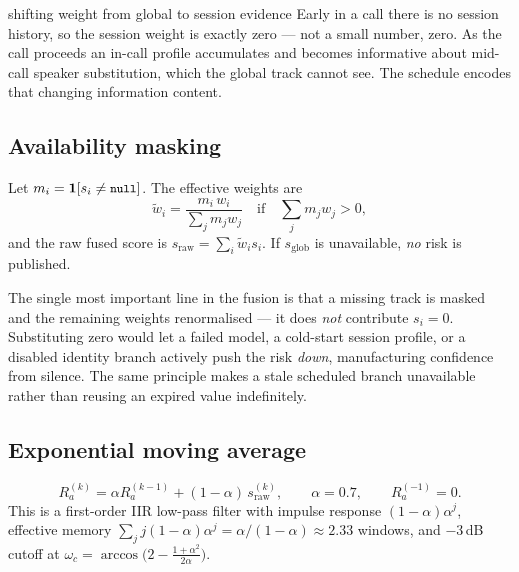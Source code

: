 \documentclass[11pt,a4paper]{article}
\newcommand{\code}[1]{\texttt{\small #1}}
\begin{document}
\begin{whybox}{shifting weight from global to session evidence}
Early in a call there is no session history, so the session weight is exactly zero ---
not a small number, zero. As the call proceeds an in-call profile accumulates and
becomes informative about mid-call speaker substitution, which the global track cannot
see. The schedule encodes that changing information content.
\end{whybox}

\subsection{Availability masking}

Let $m_i = \mathbf{1}[s_i \ne \code{null}]$. The effective weights are
\begin{equation}
\tilde w_i = \frac{m_i\, w_i}{\sum_j m_j w_j}
\quad\text{if}\quad \textstyle\sum_j m_j w_j > 0,
\end{equation}
and the raw fused score is $s_{\mathrm{raw}} = \sum_i \tilde w_i s_i$. If
$s_{\mathrm{glob}}$ is unavailable, \emph{no} risk is published.

\begin{tcolorbox}[colback=strivegrey,colframe=strivenavy,title=\textbf{Absent evidence is not evidence of innocence}]
The single most important line in the fusion is that a missing track is masked and the
remaining weights renormalised --- it does \emph{not} contribute $s_i = 0$. Substituting
zero would let a failed model, a cold-start session profile, or a disabled identity
branch actively push the risk \emph{down}, manufacturing confidence from silence. The
same principle makes a stale scheduled branch unavailable rather than reusing an expired
value indefinitely.
\end{tcolorbox}

\subsection{Exponential moving average}

\begin{equation}
R_a^{(k)} = \alpha R_a^{(k-1)} + (1-\alpha)\, s_{\mathrm{raw}}^{(k)},
\qquad \alpha = 0.7, \qquad R_a^{(-1)} = 0 .
\end{equation}
This is a first-order IIR low-pass filter with impulse response
$(1-\alpha)\alpha^j$, effective memory
$\sum_j j(1-\alpha)\alpha^j = \alpha/(1-\alpha) \approx 2.33$ windows, and
$-3$\,dB cutoff at $\omega_c = \arccos\!\big(2 - \tfrac{1+\alpha^2}{2\alpha}\big)$.
\end{document}
